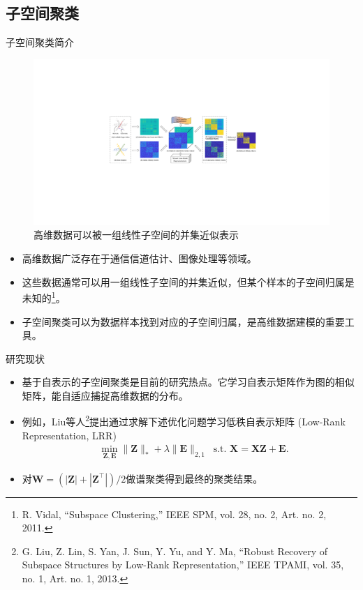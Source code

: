 \documentclass{beamer}
\begin{document}
\subsection{子空间聚类}

\begin{frame}{子空间聚类简介}
    \vspace{-0.3cm}
    \begin{figure}[htpb]
        \centering
        \includegraphics[width=0.25\linewidth]{pic/zhiguantu4_datapart.pdf}
        \vspace{-0.4cm}
        \caption{高维数据可以被一组线性子空间的并集近似表示}
    \end{figure}

    \vspace{-0.3cm}
    \begin{itemize}
        \item 高维数据广泛存在于通信信道估计、图像处理等领域。
        \vspace{0.1cm}
        \item 这些数据通常可以用一组线性子空间的并集近似，但某个样本的子空间归属是未知的\footnote{\scriptsize\cite{5714408} R. Vidal, “Subspace Clustering,” IEEE SPM, vol. 28, no. 2, Art. no. 2, 2011.}。
        \vspace{0.1cm}
        \item 子空间聚类可以为数据样本找到对应的子空间归属，是高维数据建模的重要工具。
        
    \end{itemize}
\end{frame}

\begin{frame}{研究现状}
\begin{itemize}
    \item 基于自表示的子空间聚类是目前的研究热点。它学习自表示矩阵作为图的相似矩阵，能自适应捕捉高维数据的分布。
    \vspace{0.2cm}
    
    \item 例如，Liu等人\footnote{\cite{6180173} G. Liu, Z. Lin, S. Yan, J. Sun, Y. Yu, and Y. Ma, “Robust Recovery of Subspace Structures by Low-Rank Representation,” IEEE TPAMI, vol. 35, no. 1, Art. no. 1, 2013.}提出通过求解下述优化问题学习低秩自表示矩阵 (Low-Rank Representation, LRR)
	\begin{equation}
		\begin{aligned}
			&\min _{\mathbf{Z}, \mathbf{E} }\|\mathbf{Z}\|_{*}+\lambda\|\mathbf{E}\|_{2,1} ~\text { s.t. } \mathbf{X}=\mathbf{X Z}+\mathbf{E}.
		\end{aligned}
		\label{eq_LRR}
	\end{equation}
	
	\item 对$\mathbf{W}\!=\!(|\mathbf{Z}|\!+\!|\mathbf{Z}^{\!\top}|)\!/2$做谱聚类得到最终的聚类结果。
\end{itemize}
\end{frame}
\end{document}
